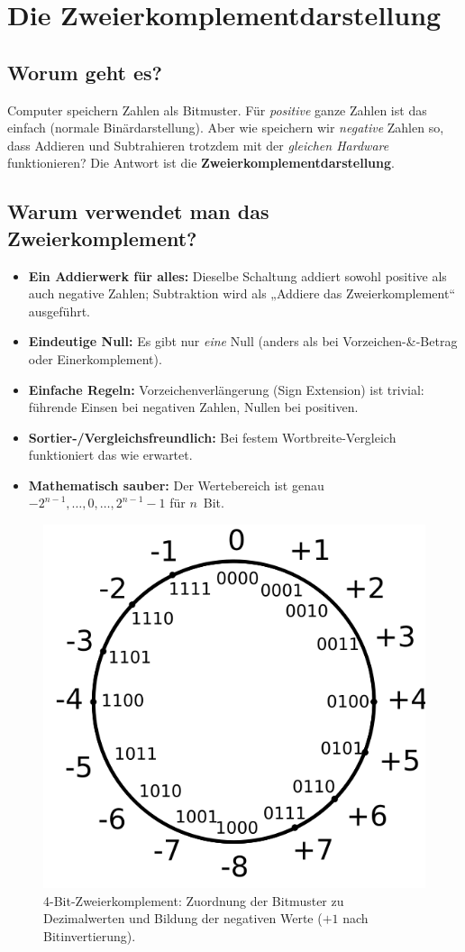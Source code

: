 \documentclass[../skript/main.tex]{subfiles}
\begin{document}
\section{Die Zweierkomplementdarstellung}

\subsection{Worum geht es?}
Computer speichern Zahlen als Bitmuster. Für \emph{positive} ganze Zahlen ist das einfach (normale Binärdarstellung). 
Aber wie speichern wir \emph{negative} Zahlen so, dass Addieren und Subtrahieren trotzdem mit der \emph{gleichen Hardware} funktionieren?
Die Antwort ist die \textbf{Zweierkomplementdarstellung}.

\subsection{Warum verwendet man das Zweierkomplement?}
\begin{itemize}
	\item \textbf{Ein Addierwerk für alles:} Dieselbe Schaltung addiert sowohl positive als auch negative Zahlen; Subtraktion wird als „Addiere das Zweierkomplement“ ausgeführt.
	\item \textbf{Eindeutige Null:} Es gibt nur \emph{eine} Null (anders als bei Vorzeichen-\&-Betrag oder Einerkomplement).
	\item \textbf{Einfache Regeln:} Vorzeichenverlängerung (Sign Extension) ist trivial: führende Einsen bei negativen Zahlen, Nullen bei positiven.
	\item \textbf{Sortier-/Vergleichsfreundlich:} Bei festem Wortbreite-Vergleich funktioniert das wie erwartet.
	\item \textbf{Mathematisch sauber:} Der Wertebereich ist genau \(-2^{n-1},\ldots,0,\ldots,2^{n-1}-1\) für \(n\)~Bit.
\end{itemize}

\begin{figure}[H]
	\centering
	\includegraphics[width=.65\textwidth]{4Bit-2Komplement.png}
	\caption{4-Bit-Zweierkomplement: Zuordnung der Bitmuster zu Dezimalwerten und Bildung der negativen Werte (\(+1\) nach Bitinvertierung).}
	\label{fig:zweierkomplement-4bit}
\end{figure}
\end{document}
